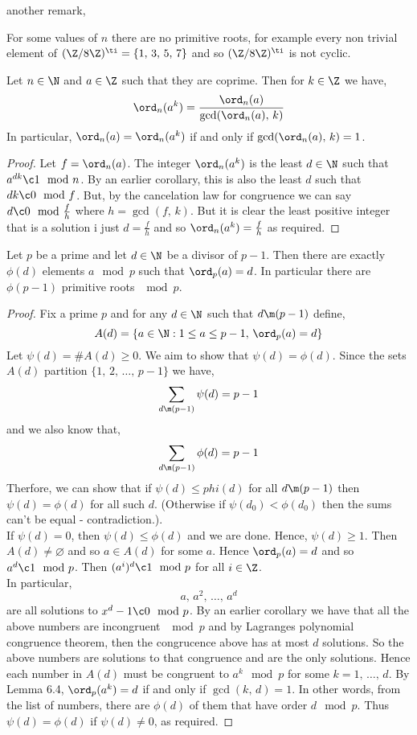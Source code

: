 another remark,
\begin{remark}
  For some values of $n$ there are no primitive roots, for example every non trivial element of $(\Z/8\Z)^\ti = \{1,\,3,\,5,\,7\}$ and so $(\Z/8\Z)^\ti$ is not cyclic.
\end{remark}

\begin{nlemma}
  Let $n \in \N$ and $a \in \Z$ such that they are coprime. Then for $k \in \Z$ we have,
  $$ \ord_n(a^k) = \frac{\ord_n(a)}{\gcd(\ord_n(a),\,k)} $$
  In particular, $\ord_n(a) = \ord_n(a^k)$ if and only if $\gcd(\ord_n(a),\,k) = 1$.
\end{nlemma}
\begin{proof}
  Let $f = \ord_n(a)$. The integer $\ord_n(a^k)$ is the least $d \in \N$ such that $a^{dk} \c 1 \mod n$. By an earlier corollary, this is also the least $d$ such that $dk \c 0 \mod f$. But, by the cancelation law for congruence we can say $d \c 0 \mod \frac{f }{h}$ where $h = \gcd(f,\,k)$. But it is clear the least positive integer that is a solution i just $d = \frac{f }{h}$ and so $\ord_n(a^k) = \frac{f }{h}$ as required.
\end{proof}

\begin{nthm}
  Let $p$ be a prime and let $d \in \N$ be a divisor of $p -1$. Then there are exactly $\phi(d)$ elements $a \mod p$ such that $\ord_p(a) = d$. In particular there are $\phi(p - 1)$ primitive roots $\mod p$.
\end{nthm}
\begin{proof}
  Fix a prime $p$ and for any $d\in \N$ such that $d \m (p - 1)$ define,
  $$ A(d) = \{a \in \N : 1 \le a \le p - 1,\, \ord_p(a) = d\} $$
  Let $\psi(d) = \# A(d) \ge 0$. We aim to show that $\psi(d) = \phi(d)$. Since the sets $A(d)$ partition $\{1,\,2,\,\dots,\, p - 1\}$ we have,
  $$ \sum_{d \m (p - 1)} \psi(d) = p - 1 $$
  and we also know that,
  $$ \sum_{d \m (p - 1)} \phi(d) = p - 1 $$
  Therfore, we can show that if $\psi(d) \le phi(d)$ for all $d \m (p - 1)$ then $\psi(d) = \phi(d)$ for all such $d$. (Otherwise if $\psi(d_0) < \phi(d_0)$ then the sums can't be equal - contradiction.).\\
  If $\psi(d) = 0$, then $\psi(d) \le \phi(d)$ and we are done. Hence, $\psi(d) \ge 1$. Then $A(d) \ne \varnothing$ and so $a \in A(d)$ for some $a$. Hence $\ord_p(a) = d$ and so $a^d \c 1\mod p$. Then $(a^i)^d \c 1 \mod p$ for all $i \in \Z$.\\
  In particular,
  $$ a,\,a^2,\,\dots,\,a^d $$
  are all solutions to $x^d - 1 \c 0 \mod p$. By an earlier corollary we have that all the above numbers are incongruent $\mod p$ and by Lagranges polynomial congruence theorem, then the congrucence above has at most $d$ solutions. So the above numbers are solutions to that congruence and are the only solutions. Hence each number in $A(d)$ must be congruent to $a^k \mod p$ for some $k = 1,\,\dots,\,d$. By Lemma 6.4, $\ord_p(a^k) = d$ if and only if $\gcd(k,\,d) = 1$. In other words, from the list of numbers, there are $\phi(d)$ of them that have order $d \mod p$. Thus $\psi (d) = \phi(d)$ if $\psi(d) \ne 0$, as required.
\end{proof}

